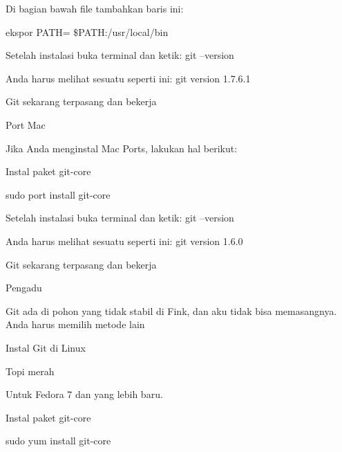 \noindent 
Di bagian bawah file tambahkan baris ini: \par
\noindent 
ekspor $  $PATH= $  \$  $PATH:/usr/local/bin \par
\vspace{12pt}
\noindent 
Setelah instalasi buka terminal dan ketik: $  $git --version \par
\noindent 
Anda harus melihat sesuatu seperti ini: $  $git version 1.7.6.1 \par
\noindent 
Git sekarang terpasang dan bekerja \par
\vspace{12pt}
\noindent 
 $  $Port Mac \par
\vspace{12pt}
\noindent 
Jika Anda menginstal Mac Ports, lakukan hal berikut: \par
\vspace{12pt}
\noindent 
Instal paket $  $git-core \par
\vspace{12pt}
\noindent 
sudo port install git-core \par
\vspace{12pt}
\noindent 
Setelah instalasi buka terminal dan ketik: $  $git --version \par
\vspace{12pt}
\noindent 
Anda harus melihat sesuatu seperti ini: $  $git version 1.6.0 \par
\noindent 
Git sekarang terpasang dan bekerja \par
\vspace{12pt}
\noindent 
 $  $Pengadu \par
\vspace{12pt}
\noindent 
Git ada di pohon yang tidak stabil di Fink, dan aku tidak bisa memasangnya. $  $Anda harus memilih metode lain \par
\vspace{12pt}
\noindent 
 $  $Instal Git di Linux \par
\vspace{12pt}
\noindent 
 $  $Topi merah \par
\vspace{12pt}
\noindent 
Untuk Fedora 7 dan yang lebih baru. \par
\vspace{12pt}
\noindent 
Instal paket $  $git-core \par
\noindent 
sudo yum install git-core \par
\vspace{12pt}
\noindent 
